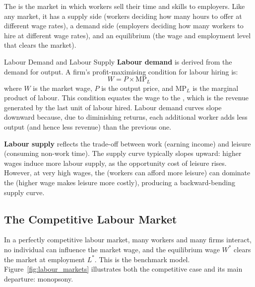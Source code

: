 The  is the market in which workers sell their time
and skills to employers. Like any market, it has a supply side (workers
deciding how many hours to offer at different wage rates), a demand side
(employers deciding how many workers to hire at different wage rates), and
an equilibrium (the wage and employment level that clears the market).

\begin{defbox}{Labour Demand and Labour Supply}
\textbf{Labour demand} is derived from the demand for output.
A firm's profit-maximising condition for labour hiring is:
\[
  W = P \times \text{MP}_L
\]
where $W$ is the market wage, $P$ is the output price, and $\text{MP}_L$
is the marginal product of labour. This condition equates the wage to
the , which is
the revenue generated by the last unit of labour hired. Labour demand
curves slope downward because, due to diminishing returns, each
additional worker adds less output (and hence less revenue) than the
previous one.

\textbf{Labour supply} reflects the trade-off between work (earning
income) and leisure (consuming non-work time). The supply curve
typically slopes upward: higher wages induce more labour supply,
as the opportunity cost of leisure rises. However, at very high wages,
the  (workers can afford more leisure) can dominate
the  (higher wage makes leisure more costly),
producing a backward-bending supply curve.
\end{defbox}

\subsection{The Competitive Labour Market}

In a perfectly competitive labour market, many workers and many firms
interact, no individual can influence the market wage, and the equilibrium
wage $W^*$ clears the market at employment $L^*$. This is the benchmark
model. Figure~\ref{fig:labour_markets} illustrates both the competitive
case and its main departure: monopsony.

